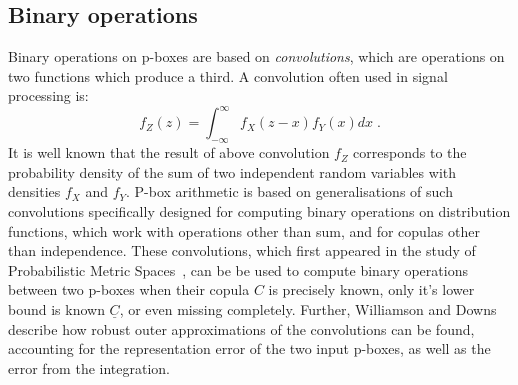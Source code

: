 \documentclass{juliacon}
\begin{document}
\subsection{Binary operations}
\label{sec:pboxBinary}
Binary operations on p-boxes are based on \textit{convolutions}, which are operations on two functions which produce a third. A convolution often used in signal processing is: 
\begin{equation*}
  f_{Z}(z) = \int^{\infty}_{-\infty}f_{X}(z-x)f_{Y}(x)dx \;.
\end{equation*}
It is well known that the result of above convolution $f_{Z}$ corresponds to the probability density of the sum of two independent random variables with densities $f_{X}$ and $f_{Y}$. P-box arithmetic is based on generalisations of such convolutions specifically designed for computing binary operations on distribution functions, which work with operations other than sum, and for copulas other than independence. These convolutions, which first appeared in the study of Probabilistic Metric Spaces~\cite{schweizer2011probabilistic}, can be be used to compute binary operations between two p-boxes when their copula $C$ is precisely known, only it's lower bound is known $\underline{C}$, or even missing completely. Further, Williamson and Downs~\cite{williamson1990probabilistic} describe how robust outer approximations of the convolutions can be found, accounting for the representation error of the two input p-boxes, as well as the error from the integration.
\end{document}
